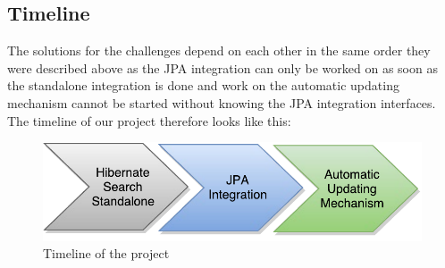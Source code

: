 \subsection{Timeline}
The solutions for the challenges depend on each other in the same order they were described above as the JPA integration can only be worked on as soon as the standalone integration is done and work on the automatic updating mechanism cannot be started without knowing the JPA integration interfaces. The timeline of our project therefore looks like this:
\\
\begin{figure}[ht]
	\centering
	\includegraphics[scale=0.75]{images/timeline_genericjpa_complete.pdf}
	\caption{Timeline of the project}
	\label{project_timeline}
\end{figure}

\pagebreak